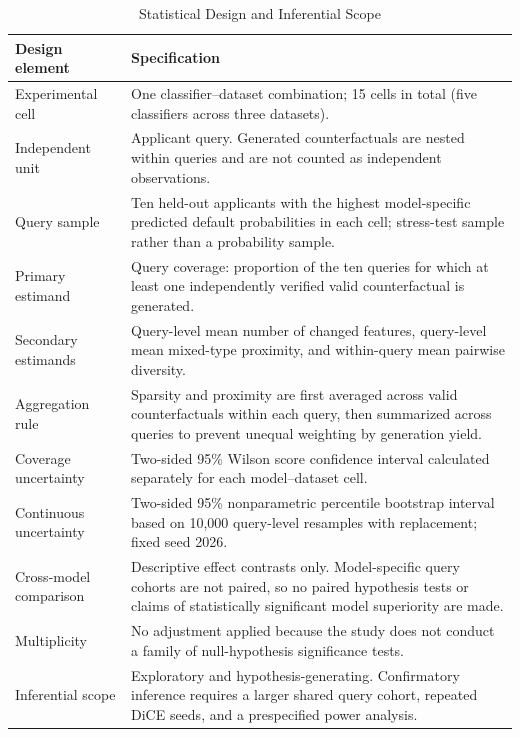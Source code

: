\documentclass[conference]{IEEEtran}
\begin{document}
\begin{table}[t]
\caption{Statistical Design and Inferential Scope}
\label{tab:statistical-design}
\centering\scriptsize
\begin{tabular}{p{3.0cm}p{12.5cm}}
\toprule
Design element & Specification \\
\midrule
Experimental cell & One classifier--dataset combination; 15 cells in total (five classifiers across three datasets). \\
Independent unit & Applicant query. Generated counterfactuals are nested within queries and are not counted as independent observations. \\
Query sample & Ten held-out applicants with the highest model-specific predicted default probabilities in each cell; stress-test sample rather than a probability sample. \\
Primary estimand & Query coverage: proportion of the ten queries for which at least one independently verified valid counterfactual is generated. \\
Secondary estimands & Query-level mean number of changed features, query-level mean mixed-type proximity, and within-query mean pairwise diversity. \\
Aggregation rule & Sparsity and proximity are first averaged across valid counterfactuals within each query, then summarized across queries to prevent unequal weighting by generation yield. \\
Coverage uncertainty & Two-sided 95\% Wilson score confidence interval calculated separately for each model--dataset cell. \\
Continuous uncertainty & Two-sided 95\% nonparametric percentile bootstrap interval based on 10,000 query-level resamples with replacement; fixed seed 2026. \\
Cross-model comparison & Descriptive effect contrasts only. Model-specific query cohorts are not paired, so no paired hypothesis tests or claims of statistically significant model superiority are made. \\
Multiplicity & No adjustment applied because the study does not conduct a family of null-hypothesis significance tests. \\
Inferential scope & Exploratory and hypothesis-generating. Confirmatory inference requires a larger shared query cohort, repeated DiCE seeds, and a prespecified power analysis. \\
\bottomrule
\end{tabular}
\end{table}
\end{document}
